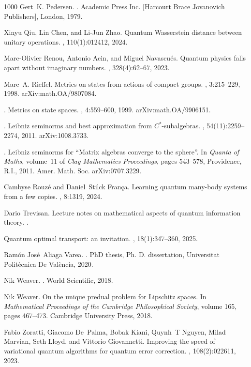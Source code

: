 \documentclass{amsart}[14pt]
\theoremstyle{definition}
\theoremstyle{remark}
\newcommand{\<}{\langle}
\renewcommand{\>}{\rangle}
\numberwithin{equation}{section}
\begin{document}
{\begin{thebibliography}{1000}
Gert~K. Pedersen.
.
\newblock Academic Press Inc. [Harcourt Brace Jovanovich Publishers], London,
  1979.

Xinyu Qiu, Lin Chen, and Li-Jun Zhao.
\newblock Quantum Wasserstein distance between unitary operations.
, 110(1):012412, 2024.

Marc-Olivier Renou, Antonio Acin, and Miguel Navascu{\'e}s.
\newblock Quantum physics falls apart without imaginary numbers.
, 328(4):62--67, 2023.

Marc~A. Rieffel.
\newblock Metrics on states from actions of compact groups.
, 3:215--229, 1998.
\newblock arXiv:math.OA/9807084.

\bysame.
\newblock Metrics on state spaces.
, 4:559--600, 1999.
\newblock arXiv:math.OA/9906151.

\bysame.
\newblock Leibniz seminorms and best approximation from {$C^*$}-subalgebras.
, 54(11):2259--2274, 2011.
\newblock arXiv:1008.3733.

\bysame.
\newblock Leibniz seminorms for ``{M}atrix algebras converge to the sphere''.
\newblock In {\em Quanta of Maths}, volume~11 of {\em Clay Mathematics
  Proceedings}, pages 543--578, Providence, R.I., 2011. Amer. Math. Soc.
\newblock arXiv:0707.3229.

Cambyse Rouz{\'e} and Daniel~Stilck Fran{\c{c}}a.
\newblock Learning quantum many-body systems from a few copies.
, 8:1319, 2024.

Dario Trevisan.
\newblock Lecture notes on mathematical aspects of quantum information theory.
.

\bysame
\newblock Quantum optimal transport: an invitation.
, 18(1):347--360,
  2025.

Ram{\'o}n Jos{\'e}~Aliaga Varea.
.
\newblock PhD thesis, Ph. D. dissertation, Universitat Polit{\`e}cnica De
  Val{\`e}ncia, 2020.

Nik Weaver.
.
\newblock World Scientific, 2018.

Nik Weaver.
\newblock On the unique predual problem for Lipschitz spaces.
\newblock In {\em Mathematical Proceedings of the Cambridge Philosophical
  Society}, volume 165, pages 467--473. Cambridge University Press, 2018.

Fabio Zoratti, Giacomo De~Palma, Bobak Kiani, Quynh~T Nguyen, Milad Marvian,
  Seth Lloyd, and Vittorio Giovannetti.
\newblock Improving the speed of variational quantum algorithms for quantum
  error correction.
, 108(2):022611, 2023.

\end{thebibliography}

}    %
\end{document}
